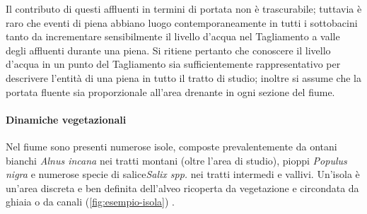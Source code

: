 %
Il contributo di questi affluenti in termini di portata non è trascurabile; tuttavia è raro che eventi di piena abbiano luogo contemporaneamente in tutti i sottobacini tanto da incrementare sensibilmente il livello d'acqua nel Tagliamento a valle degli affluenti durante una piena.
Si ritiene pertanto che conoscere il livello d'acqua in un punto del Tagliamento sia sufficientemente rappresentativo per descrivere l'entità di una piena in tutto il tratto di studio; inoltre si assume che la portata fluente sia proporzionale all'area drenante in ogni sezione del fiume.

\paragraph{Dinamiche vegetazionali}
Nel fiume sono presenti numerose isole, composte prevalentemente da ontani bianchi \emph{Alnus incana} nei tratti montani (oltre l'area di studio), pioppi \emph{Populus nigra} e numerose specie di salice\emph{Salix spp.} nei tratti intermedi e vallivi.
Un'isola è un'area discreta e ben definita dell'alveo ricoperta da vegetazione e circondata da ghiaia o da canali (\vref{fig:esempio-isola}) .
%
